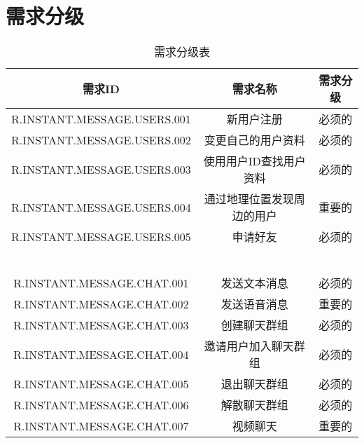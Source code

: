 \chapter{需求分级}
\begin{table}[htbp]
\centering
\caption{需求分级表} \label{tab:classification}
\begin{tabular}{|c|c|c|}
    \hline
    需求ID & 需求名称 & 需求分级 \\
    \hline
    R.INSTANT.MESSAGE.USERS.001 & 新用户注册 & 必须的 \\
    \hline
    R.INSTANT.MESSAGE.USERS.002 & 变更自己的用户资料 & 必须的 \\
    \hline
    R.INSTANT.MESSAGE.USERS.003 & 使用用户ID查找用户资料 & 必须的 \\
    \hline
    R.INSTANT.MESSAGE.USERS.004 & 通过地理位置发现周边的用户 & 重要的 \\
    \hline
    R.INSTANT.MESSAGE.USERS.005 & 申请好友 & 必须的 \\
    \hline
    {\color{red}{R.INSTANT.MESSAGE.USERS.006}} & {\color{red}{删除好友}} & {\color{red}{必须的}} \\
    \hline
    {\color{red}{R.INSTANT.MESSAGE.USERS.007}} & {\color{red}{好友推荐}} & {\color{red}{重要的}} \\
    \hline
    {\color{red}{R.INSTANT.MESSAGE.USERS.008}} & {\color{red}{用户主页}} & {\color{red}{重要的}} \\
    \hline
    {\color{red}{R.INSTANT.MESSAGE.USERS.009}} & {\color{red}{好友清理}} & {\color{red}{重要的}} \\
    \hline
    {\color{red}{R.INSTANT.MESSAGE.USERS.010}} & {\color{red}{设置黑名单}} & {\color{red}{必须的}} \\
    \hline
    {\color{red}{R.INSTANT.MESSAGE.USERS.011}} & {\color{red}{隐私设置}} & {\color{red}{必须的}} \\
    \hline
    R.INSTANT.MESSAGE.CHAT.001 & 发送文本消息 & 必须的 \\
    \hline
    R.INSTANT.MESSAGE.CHAT.002 & 发送语音消息 & 重要的 \\
    \hline
    R.INSTANT.MESSAGE.CHAT.003 & 创建聊天群组 & 必须的 \\
    \hline
    R.INSTANT.MESSAGE.CHAT.004 & 邀请用户加入聊天群组 & 必须的 \\
    \hline
    R.INSTANT.MESSAGE.CHAT.005 & 退出聊天群组 & 必须的 \\
    \hline
    R.INSTANT.MESSAGE.CHAT.006 & 解散聊天群组 & 必须的 \\
    \hline
    R.INSTANT.MESSAGE.CHAT.007 & 视频聊天 & 重要的 \\
    \hline
\end{tabular}
\end{table}

